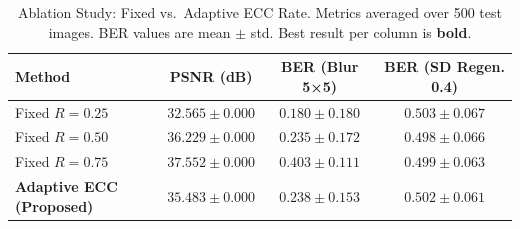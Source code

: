 \begin{table}[t]
  \caption{Ablation Study: Fixed vs.~Adaptive ECC Rate. Metrics averaged over 500 test images.
    BER values are mean $\pm$ std. Best result per column is \textbf{bold}.}
  \label{tab:ablation}
  \centering
  \begin{tabular}{lccc}
    \toprule
    \textbf{Method} & \textbf{PSNR (dB)} & \textbf{BER (Blur 5×5)} & \textbf{BER (SD Regen. 0.4)} \\
    \midrule
    Fixed $R=0.25$ & $32.565 \pm 0.000$ & $\mathbf{\mathbf{0.180} \pm 0.180}$ & $0.503 \pm 0.067$ \\
    Fixed $R=0.50$ & $36.229 \pm 0.000$ & $0.235 \pm 0.172$ & $\mathbf{\mathbf{0.498} \pm 0.066}$ \\
    Fixed $R=0.75$ & $\mathbf{\mathbf{37.552} \pm 0.000}$ & $0.403 \pm 0.111$ & $0.499 \pm 0.063$ \\
    \midrule
    \textbf{Adaptive ECC (Proposed)} & $35.483 \pm 0.000$ & $0.238 \pm 0.153$ & $0.502 \pm 0.061$ \\
    \bottomrule
  \end{tabular}
\end{table}